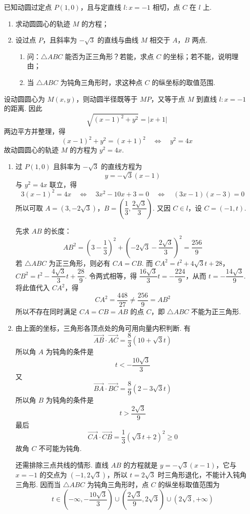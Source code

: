 \begin{problem}
已知动圆过定点 \(P(1,0)\)，且与定直线 \(l:x=-1\) 相切，点 \(C\) 在 \(l\) 上.

\begin{enumerate}
\item 求动圆圆心的轨迹 \(M\) 的方程；
\item 设过点 \(P\)，且斜率为 \(-\sqrt3\) 的直线与曲线 \(M\) 相交于 \(A\)，\(B\) 两点.
\begin{enumerate}
\item 问：\(\triangle ABC\) 能否为正三角形？若能，求点 \(C\) 的坐标；若不能，说明理由；
\item 当 \(\triangle ABC\) 为钝角三角形时，求这种点 \(C\) 的纵坐标的取值范围.
\end{enumerate}
\end{enumerate}
\end{problem}

\begin{solution}
设动圆圆心为 \(M(x,y)\)，则动圆半径既等于 \(MP\)，又等于点 \(M\) 到直线 \(l:x=-1\) 的距离. 因此
\[
\sqrt{(x-1)^2+y^2}=|x+1|
\]
两边平方并整理，得
\[
(x-1)^2+y^2=(x+1)^2
\quad\Longleftrightarrow\quad y^2=4x
\]
故动圆圆心的轨迹 \(M\) 的方程为 \(y^2=4x\).

\begin{enumerate}
\item 过 \(P(1,0)\) 且斜率为 \(-\sqrt3\) 的直线方程为
\[
y=-\sqrt3(x-1)
\]
与 \(y^2=4x\) 联立，得
\[
3(x-1)^2=4x
\quad\Longleftrightarrow\quad
3x^2-10x+3=0
\quad\Longleftrightarrow\quad
(3x-1)(x-3)=0
\]
所以可取 \(A=(3,-2\sqrt3)\)，\(B=\left(\dfrac13,\dfrac{2\sqrt3}{3}\right)\).
又因 \(C\in l\)，设 \(C=(-1,t)\).

先求 \(AB\) 的长度：
\[
AB^2=\left(3-\dfrac13\right)^2+\left(-2\sqrt3-\dfrac{2\sqrt3}{3}\right)^2=\dfrac{256}{9}
\]
若 \(\triangle ABC\) 为正三角形，则必有 \(CA=CB\). 而 \(CA^2=t^2+4\sqrt3t+28\)，\(CB^2=t^2-\dfrac{4\sqrt3}{3}t+\dfrac{28}{9}\).
令两式相等，得 \(\dfrac{16\sqrt3}{3}t=-\dfrac{224}{9}\)，从而 \(t=-\dfrac{14\sqrt3}{9}\).
将此值代入 \(CA^2\)，得
\[
CA^2=\dfrac{448}{27}\ne\dfrac{256}{9}=AB^2
\]
所以不存在同时满足 \(CA=CB=AB\) 的点 \(C\)，即 \(\triangle ABC\) 不能为正三角形.

\item 由上面的坐标，三角形各顶点处的角可用向量内积判断. 有
\[
\overrightarrow{AB}\cdot\overrightarrow{AC}
=\dfrac83(10+\sqrt3t)
\]
所以角 \(A\) 为钝角的条件是
\[
t<-\dfrac{10\sqrt3}{3}
\]
又
\[
\overrightarrow{BA}\cdot\overrightarrow{BC}
=\dfrac89(2-3\sqrt3t)
\]
所以角 \(B\) 为钝角的条件是
\[
t>\dfrac{2\sqrt3}{9}
\]
最后
\[
\overrightarrow{CA}\cdot\overrightarrow{CB}
=\dfrac13\left(\sqrt3t+2\right)^2\geqslant0
\]
故角 \(C\) 不可能为钝角.

还需排除三点共线的情形. 直线 \(AB\) 的方程就是 \(y=-\sqrt3(x-1)\)，它与 \(x=-1\) 的交点为 \((-1,2\sqrt3)\)，所以 \(t=2\sqrt3\) 时三角形退化，不能计入钝角三角形. 因而当 \(\triangle ABC\) 为钝角三角形时，点 \(C\) 的纵坐标取值范围为
\[
t\in\left(-\infty,-\dfrac{10\sqrt3}{3}\right)\cup\left(\dfrac{2\sqrt3}{9},2\sqrt3\right)\cup\left(2\sqrt3,+\infty\right)
\]
\end{enumerate}
\end{solution}
